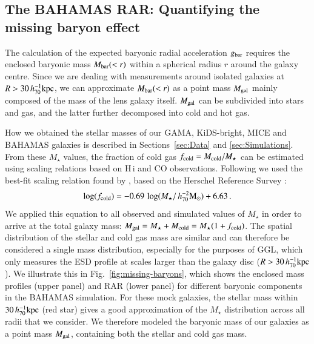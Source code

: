 \documentclass{aa}
\newcommand{\hmsun}{\,h_{70}^{-2} {\rm M_\odot}}
\newcommand{\hkpc}{\,h_{70}^{-1}{\rm{kpc}} }
\newcommand{\un}[1]{_{\rm #1}}
\begin{document}
\subsection{The BAHAMAS RAR: Quantifying the missing baryon effect}
\label{sec:Missing_Baryons}

The calculation of the expected baryonic radial acceleration $g\un{bar}$ requires the enclosed baryonic mass $M\un{bar}(<r)$ within a spherical radius $r$ around the galaxy centre. Since we are dealing with measurements around isolated galaxies at $R>30\hkpc$, we can approximate $M\un{bar}(<r)$ as a point mass $M\un{gal}$ mainly composed of the mass of the lens galaxy itself. $M\un{gal}$ can be subdivided into stars and gas, and the latter further decomposed into cold and hot gas.

How we obtained the stellar masses of our GAMA, KiDS-bright, MICE and BAHAMAS galaxies is described in Sections~\ref{sec:Data} and \ref{sec:Simulations}. From these $M_\star$ values, the fraction of cold gas $f\un{cold} = M\un{cold}/M_\star$ can be estimated using scaling relations based on H\,{\sc i} and CO observations. Following \cite{brouwer2017} we used the best-fit scaling relation found by \cite{boselli2014}, based on the Herschel Reference Survey \cite[]{boselli2010}:
\begin{equation}\label{eq:fcold}
\log(f\un{cold}) = -0.69 \, \log(M_\star/\hmsun) + 6.63 \, .
\end{equation}
We applied this equation to all observed and simulated values of $M_\star$ in order to arrive at the total galaxy mass: $M\un{gal} = M_\star + M\un{cold} = M_\star (1 + f\un{cold})$. The spatial distribution of the stellar and cold gas mass are similar \cite[]{pohlen2010,crocker2011,cooper2012,davis2013} and can therefore be considered a single mass distribution, especially for the purposes of GGL, which only measures the ESD profile at scales larger than the galaxy disc ($R>30\hkpc$). We illustrate this in Fig.~\ref{fig:missing-baryons}, which shows the enclosed mass profiles (upper panel) and RAR (lower panel) for different baryonic components in the BAHAMAS simulation. For these mock galaxies, the stellar mass within $30 \hkpc$ (red star) gives a good approximation of the $M_\star$ distribution across all radii that we consider. We therefore modeled the baryonic mass of our galaxies as a point mass $M\un{gal}$, containing both the stellar and cold gas mass.
\end{document}
